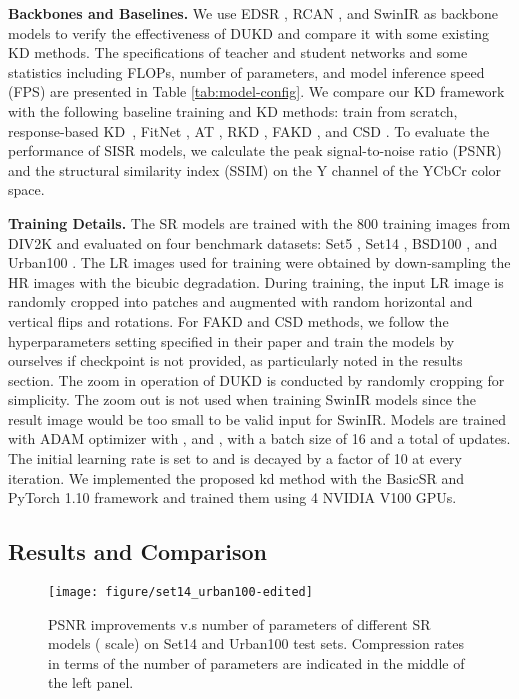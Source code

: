 \documentclass[10pt,twocolumn,letterpaper]{article}
\begin{document}
\textbf{Backbones and Baselines.} We use EDSR \cite{lim2017enhanced}, RCAN \cite{zhang2018image}, and SwinIR \cite{liang2021swinir} as backbone models to verify the effectiveness of DUKD and compare it with some existing KD methods. The specifications of teacher and student networks and some statistics including FLOPs, number of parameters, and model inference speed (FPS) are presented in Table \ref{tab:model-config}. We compare our KD framework with the following baseline training and KD methods: train from scratch, response-based KD~\cite{hinton2015distilling}, FitNet \cite{romero2014fitnets}, AT \cite{zagoruyko2016paying}, RKD \cite{park2019relational}, FAKD \cite{he2020fakd}, and CSD \cite{wang2021towards}. To evaluate the performance of SISR models, we calculate the peak signal-to-noise ratio (PSNR) and the structural similarity index (SSIM) on the Y channel of the YCbCr color space.

\noindent\textbf{Training Details.} The SR models are trained with the 800 training images from DIV2K \cite{timofte2017ntire} and evaluated on four benchmark datasets: Set5 \cite{bevilacqua2012low}, Set14 \cite{zeyde2012single}, BSD100 \cite{martin2001database}, and Urban100 \cite{huang2015single}. The LR images used for training were obtained by down-sampling the HR images with the bicubic degradation. During training, the input LR image is randomly cropped into  patches and augmented with random horizontal and vertical flips and rotations. For FAKD and CSD methods, we follow the hyperparameters setting specified in their paper and train the models by ourselves if checkpoint is not provided, as particularly noted in the results section. The zoom in operation of DUKD is conducted by randomly cropping for simplicity. The zoom out is not used when training SwinIR models since the result image would be too small to be valid input for SwinIR. Models are trained with ADAM optimizer \cite{kingma2014adam} with ,  and , with a batch size of 16 and a total of  updates. The initial learning rate is set to  and is decayed by a factor of 10 at every  iteration. We implemented the proposed kd method with the BasicSR \cite{basicsr} and PyTorch 1.10 framework and trained them using 4 NVIDIA V100 GPUs.

\subsection{Results and Comparison}\label{sec: exp-results}
\begin{figure}[h]
	\centering
	\texttt{[image: figure/set14\_urban100-edited]}\vspace{-0.5em}
	\caption{PSNR improvements v.s number of parameters of different SR models ( scale) on Set14 and Urban100 test sets. Compression rates in terms of the number of parameters are indicated in the middle of the left panel.}
	\label{fig:psnr-improvement}\vspace{-0.5em}
\end{figure}
\end{document}
